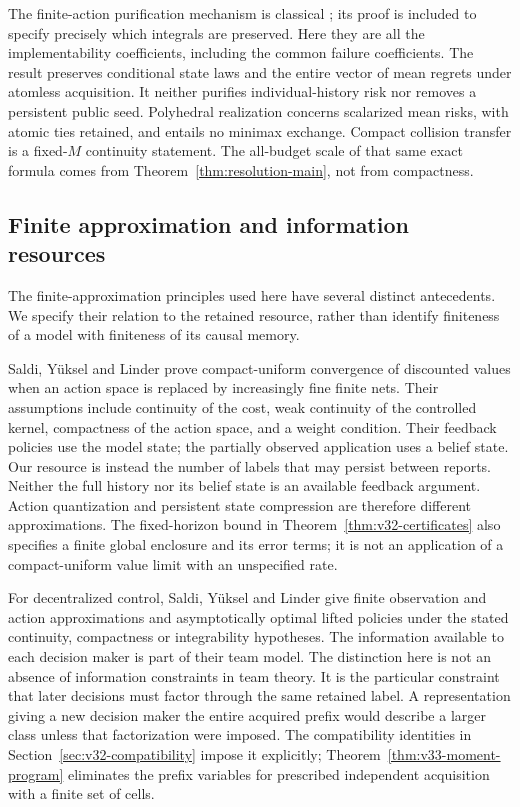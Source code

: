 The finite-action purification mechanism is classical
\cite{DWW1951}; its proof is included to specify precisely which
integrals are preserved. Here they are all the implementability
coefficients, including the common failure coefficients. The result
preserves conditional state laws and the entire vector of mean regrets
under atomless acquisition. It neither purifies individual-history
risk nor removes a persistent public seed. Polyhedral realization
concerns scalarized mean risks, with atomic ties retained, and entails
no minimax exchange. Compact collision transfer is a fixed-$M$
continuity statement. The all-budget scale of that same exact formula
comes from Theorem~\ref{thm:resolution-main}, not from compactness.

\subsection{Finite approximation and information resources}
The finite-approximation principles used here have several distinct
antecedents. We specify their relation to the retained resource, rather
than identify finiteness of a model with finiteness of its causal memory.

Saldi, Y\"uksel and Linder \cite[Assumption 3.1 and Theorem 3.2]{SYLWeak2016}
prove compact-uniform convergence of discounted values when an action
space is replaced by increasingly fine finite nets. Their assumptions
include continuity of the cost, weak continuity of the controlled kernel,
compactness of the action space, and a weight condition. Their feedback
policies use the model state; the partially observed application uses
a belief state. Our resource is instead the number of labels that may
persist between reports. Neither the full history nor its belief state
is an available feedback argument. Action quantization and persistent
state compression are therefore different approximations. The
fixed-horizon bound in Theorem~\ref{thm:v32-certificates} also specifies
a finite global enclosure and its error terms; it is not an application
of a compact-uniform value limit with an unspecified rate.

For decentralized control, Saldi, Y\"uksel and Linder
\cite[Theorems 4, 5 and 11]{SYLTeams2015} give finite observation and
action approximations and asymptotically optimal lifted policies under
the stated continuity, compactness or integrability hypotheses. The
information available to each decision maker is part of their team
model. The distinction here is not an absence of information constraints
in team theory. It is the particular constraint that later decisions
must factor through the same retained label. A representation giving a
new decision maker the entire acquired prefix would describe a larger
class unless that factorization were imposed. The compatibility
identities in Section~\ref{sec:v32-compatibility} impose it explicitly;
Theorem~\ref{thm:v33-moment-program} eliminates the prefix variables
for prescribed independent acquisition with a finite set of cells.

